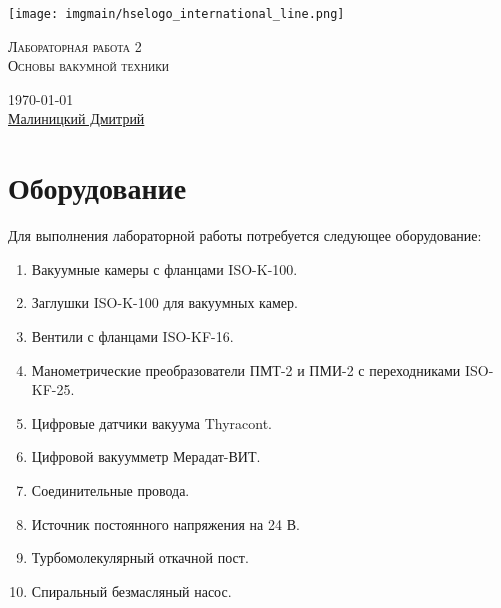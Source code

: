 \documentclass[12pt,oneside,a4paper]{article}
\makeatletter
\def\projecttype{Лабораторная работа }%
\def\projectno{2}%
\def\projectname{Основы вакумной техники}%
\def\perenos{10}%
\def\name{\href{https://t.me/mali_na}{Малиницкий Дмитрий}}%
\renewcommand{\headrulewidth}{0.2pt}
\renewcommand\tableofcontents{%
    \if@twocolumn
      \@restonecoltrue\onecolumn
    \else
      \@restonecolfalse
    \fi
    \section*{\contentsname
        \@mkboth{%
           \MakeUppercase\contentsname}{\MakeUppercase\contentsname}}%
    \@starttoc{toc}%
    \if@restonecol\twocolumn\fi
    }
\makeatother
\begin{document}
\renewcommand{\headrulewidth}{0pt}

\renewcommand{\thesection}{\arabic{section}}


\begin{titlepage}
  \thispagestyle{empty}
   \thispagestyle{fancy}
   \begin{center}
        \vspace*{8em}
   
        \centering\texttt{[image: imgmain/hselogo\_international\_line.png]}

        \vspace{3em}

        \Huge{\textsc{\projecttype  \projectno \\ \projectname}}

        \vspace{\perenos em}
        
   \Large {\today \\ \name}
      
   \end{center}


\end{titlepage}

\renewcommand{\headrulewidth}{0.2pt}

\newpage



\parindent=0.5cm




\tableofcontents

\newpage

\section{Оборудование}

Для выполнения лабораторной работы потребуется следующее оборудование:
\begin{enumerate}
    \item Вакуумные камеры с фланцами ISO-K-100.
    \item Заглушки ISO-K-100 для вакуумных камер.
    \item Вентили с фланцами ISO-KF-16.
    \item Манометрические преобразователи ПМТ-2 и ПМИ-2 с переходниками ISO-KF-25.
    \item Цифровые датчики вакуума Thyracont.
    \item Цифровой вакуумметр Мерадат-ВИТ.
    \item Соединительные провода.
    \item Источник постоянного напряжения на 24 В.
    \item Турбомолекулярный откачной пост.
    \item Спиральный безмасляный насос.
\end{enumerate}
\end{document}
